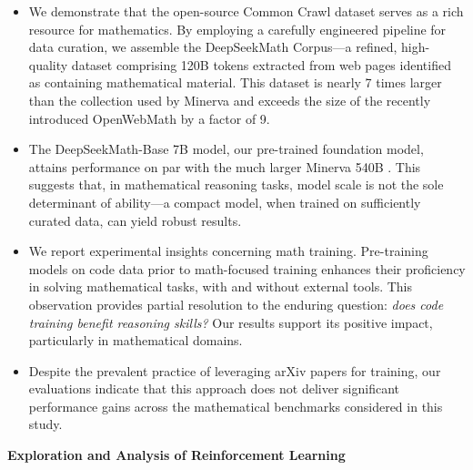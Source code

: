 \begin{itemize}[topsep=0pt]
    \item We demonstrate that the open-source Common Crawl dataset serves as a rich resource for mathematics. By employing a carefully engineered pipeline for data curation, we assemble the DeepSeekMath Corpus—a refined, high-quality dataset comprising 120B tokens extracted from web pages identified as containing mathematical material. This dataset is nearly 7 times larger than the collection used by Minerva \citep{minerva} and exceeds the size of the recently introduced OpenWebMath \citep{openwebmath} by a factor of 9.

    \item The DeepSeekMath-Base 7B model, our pre-trained foundation model, attains performance on par with the much larger Minerva 540B \citep{minerva}. This suggests that, in mathematical reasoning tasks, model scale is not the sole determinant of ability—a compact model, when trained on sufficiently curated data, can yield robust results.

    \item We report experimental insights concerning math training. Pre-training models on code data prior to math-focused training enhances their proficiency in solving mathematical tasks, with and without external tools. This observation provides partial resolution to the enduring question: \textit{does code training benefit reasoning skills?} Our results support its positive impact, particularly in mathematical domains.

    \item Despite the prevalent practice of leveraging arXiv papers for training, our evaluations indicate that this approach does not deliver significant performance gains across the mathematical benchmarks considered in this study.
\end{itemize}

\textbf{Exploration and Analysis of Reinforcement Learning}

